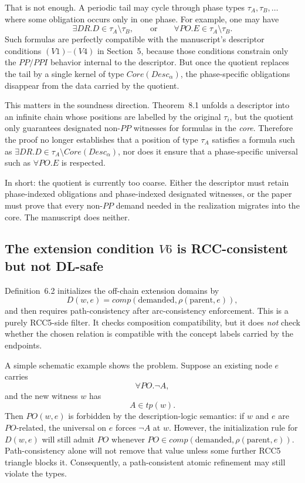 \documentclass[11pt]{article}
\begin{document}
That is not enough. A periodic tail may cycle through phase types $\tau_A,\tau_B,\ldots$ where some obligation occurs only in one phase. For example, one may have
\[
\exists DR.D \in \tau_A \setminus \tau_B,
\qquad\text{or}\qquad
\forall PO.E \in \tau_A \setminus \tau_B.
\]
Such formulas are perfectly compatible with the manuscript's descriptor conditions $(V1)$--$(V4)$ in Section~5, because those conditions constrain only the $PP/PPI$ behavior internal to the descriptor. But once the quotient replaces the tail by a single kernel of type $Core(Desc_\alpha)$, the phase-specific obligations disappear from the data carried by the quotient.

This matters in the soundness direction. Theorem~8.1 unfolds a descriptor into an infinite chain whose positions are labelled by the original $\tau_i$, but the quotient only guarantees designated non-$PP$ witnesses for formulas in the \emph{core}. Therefore the proof no longer establishes that a position of type $\tau_A$ satisfies a formula such as $\exists DR.D \in \tau_A\setminus Core(Desc_\alpha)$, nor does it ensure that a phase-specific universal such as $\forall PO.E$ is respected.

In short: the quotient is currently too coarse. Either the descriptor must retain phase-indexed obligations and phase-indexed designated witnesses, or the paper must prove that every non-$PP$ demand needed in the realization migrates into the core. The manuscript does neither.

\subsection{The extension condition $V6$ is RCC-consistent but not DL-safe}

Definition~6.2 initializes the off-chain extension domains by
\[
D(w,e)=comp(\text{demanded},\rho(\text{parent},e)),
\]
and then requires path-consistency after arc-consistency enforcement. This is a purely RCC5-side filter. It checks composition compatibility, but it does \emph{not} check whether the chosen relation is compatible with the concept labels carried by the endpoints.

A simple schematic example shows the problem. Suppose an existing node $e$ carries
\[
\forall PO.\neg A,
\]
and the new witness $w$ has
\[
A \in tp(w).
\]
Then $PO(w,e)$ is forbidden by the description-logic semantics: if $w$ and $e$ are $PO$-related, the universal on $e$ forces $\neg A$ at $w$. However, the initialization rule for $D(w,e)$ will still admit $PO$ whenever $PO \in comp(\text{demanded},\rho(\text{parent},e))$. Path-consistency alone will not remove that value unless some further RCC5 triangle blocks it. Consequently, a path-consistent atomic refinement may still violate the types.
\end{document}
